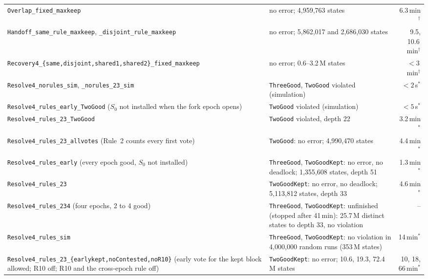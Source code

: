 \documentclass[conference]{IEEEtran}
\begin{document}
\begin{table}[t]
\begin{tabularx}{\textwidth}{@{}>{\raggedright\arraybackslash}p{}Yr@{}}
\texttt{Overlap\_\allowbreak{}fixed\_\allowbreak{}maxkeep} & no error; 4,959,763 states & 6.3\,min$^\dagger$\\
\texttt{Handoff\_\allowbreak{}same\_\allowbreak{}rule\_\allowbreak{}maxkeep},\allowbreak{} \texttt{\_\allowbreak{}disjoint\_\allowbreak{}rule\_\allowbreak{}maxkeep} & no error; 5,862,017 and 2,686,030 states & 9.5, 10.6\,min$^\dagger$\\
\texttt{Recovery4\_\allowbreak{}\{same,\allowbreak{}disjoint,\allowbreak{}shared1,\allowbreak{}shared2\}\_\allowbreak{}fixed\_\allowbreak{}maxkeep} & no error; 0.6--3.2\,M states & $<3$\,min$^\dagger$\\
\midrule
\texttt{Resolve4\_\allowbreak{}norules\_\allowbreak{}sim},\allowbreak{} \texttt{\_\allowbreak{}norules\_\allowbreak{}23\_\allowbreak{}sim} & \texttt{ThreeGood}, \texttt{TwoGood} violated (simulation) & $<2$\,s$^*$\\
\texttt{Resolve4\_\allowbreak{}rules\_\allowbreak{}early\_\allowbreak{}TwoGood} ($S_0$ not installed when the fork epoch opens) & \texttt{TwoGood} violated (simulation) & $<5$\,s$^*$\\
\texttt{Resolve4\_\allowbreak{}rules\_\allowbreak{}23\_\allowbreak{}TwoGood} & \texttt{TwoGood} violated, depth 22 & 3.2\,min$^*$\\
\texttt{Resolve4\_\allowbreak{}rules\_\allowbreak{}23\_\allowbreak{}allvotes} (Rule~2 counts every first vote) & \texttt{TwoGood}: no error; 4,990,470 states & 4.4\,min$^*$\\
\texttt{Resolve4\_\allowbreak{}rules\_\allowbreak{}early} (every epoch good, $S_0$ not installed) & \texttt{ThreeGood}, \texttt{TwoGoodKept}: no error, no deadlock; 1,355,608 states, depth 51 & 1.3\,min$^*$\\
\texttt{Resolve4\_\allowbreak{}rules\_\allowbreak{}23} & \texttt{TwoGoodKept}: no error, no deadlock; 5,113,812 states, depth 33 & 4.6\,min$^*$\\
\texttt{Resolve4\_\allowbreak{}rules\_\allowbreak{}234} (four epochs, 2 to 4 good) & \texttt{ThreeGood}, \texttt{TwoGoodKept}: unfinished (stopped after 41\,min): 25.7\,M distinct states to depth 33, no violation & --\\
\texttt{Resolve4\_\allowbreak{}rules\_\allowbreak{}sim} & \texttt{ThreeGood}, \texttt{TwoGoodKept}: no violation in 4,000,000 random runs (353\,M states) & 14\,min$^*$\\
\texttt{Resolve4\_\allowbreak{}rules\_\allowbreak{}23\_\allowbreak{}\{earlykept,\allowbreak{}noContested,\allowbreak{}noR10\}} (early vote for the kept block allowed; R10 off; R10 and the cross-epoch rule off) & \texttt{TwoGoodKept}: no error; 10.6, 19.3, 72.4\,M states & 10, 18, 66\,min$^*$\\

\end{tabularx}
\end{table}
\end{document}
